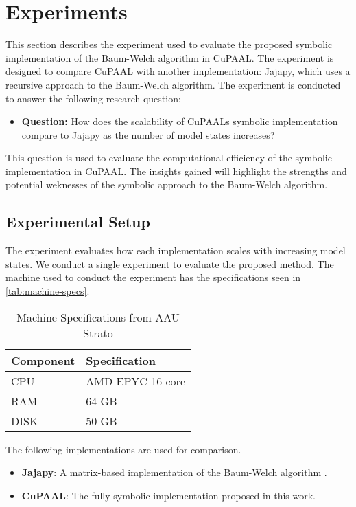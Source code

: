 \section{Experiments}\label{sec:experiments}
This section describes the experiment used to evaluate the proposed symbolic implementation of the Baum-Welch algorithm in CuPAAL.
The experiment is designed to compare CuPAAL with another implementation: Jajapy, which uses a recursive approach to the Baum-Welch algorithm.
The experiment is conducted to answer the following research question:

\begin{itemize}
\item \textbf{Question:} How does the scalability of CuPAALs symbolic implementation compare to Jajapy as the number of model states increases?
\end{itemize}

This question is used to evaluate the computational efficiency of the symbolic implementation in CuPAAL. The insights gained will highlight the strengths and potential weknesses of the symbolic approach to the Baum-Welch algorithm.

\subsection{Experimental Setup}
The experiment evaluates how each implementation scales with increasing model states. 
We conduct a single experiment to evaluate the proposed method.
The machine used to conduct the experiment has the specifications seen in \autoref{tab:machine-specs}. 
\begin{table}[htb!]
\centering
\caption{Machine Specifications from AAU Strato}
\label{tab:machine-specs}
    \begin{tabular}{ll}
        \toprule
        \textbf{Component} & \textbf{Specification} \\
        \midrule
        CPU & AMD EPYC 16-core \\
        RAM & 64 GB \\
        DISK & 50 GB \\
        \bottomrule
    \end{tabular}
\end{table}

The following implementations are used for comparison.

\begin{itemize}
\item \textbf{Jajapy}: A matrix-based implementation of the Baum-Welch algorithm \cite{reynouard2023jajapy}.
\item \textbf{CuPAAL}: The fully symbolic implementation proposed in this work.
\end{itemize}

